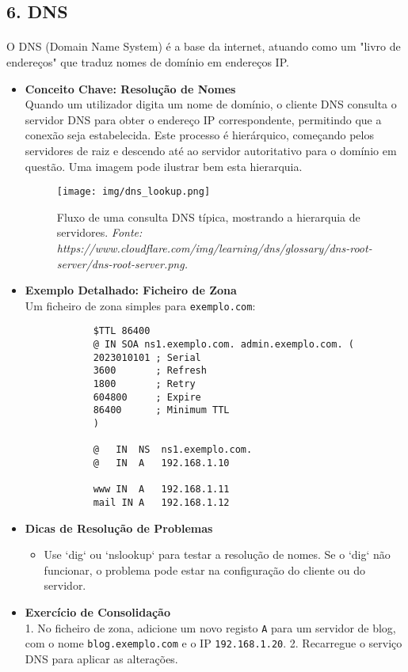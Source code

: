 \documentclass[10pt,a4paper]{article}
\begin{document}
	\subsection*{6. DNS}
	\vspace{-1.2em}
	\paragraph{}
	O DNS (Domain Name System) é a base da internet, atuando como um "livro de endereços" que traduz nomes de domínio em endereços IP.
	
	\begin{itemize}
		\item \textbf{Conceito Chave: Resolução de Nomes} \\
		Quando um utilizador digita um nome de domínio, o cliente DNS consulta o servidor DNS para obter o endereço IP correspondente, permitindo que a conexão seja estabelecida. Este processo é hierárquico, começando pelos servidores de raiz e descendo até ao servidor autoritativo para o domínio em questão. Uma imagem pode ilustrar bem esta hierarquia.
		
		\begin{figure}[h]
			\centering
			\texttt{[image: img/dns\_lookup.png]}
			\caption{Fluxo de uma consulta DNS típica, mostrando a hierarquia de servidores. \textit{Fonte: https://www.cloudflare.com/img/learning/dns/glossary/dns-root-server/dns-root-server.png.}}
			\label{fig:dns_lookup}
		\end{figure}
		
		\item \textbf{Exemplo Detalhado: Ficheiro de Zona} \\
		Um ficheiro de zona simples para \texttt{exemplo.com}:
		\begin{verbatim}
			$TTL 86400
			@ IN SOA ns1.exemplo.com. admin.exemplo.com. (
			2023010101 ; Serial
			3600       ; Refresh
			1800       ; Retry
			604800     ; Expire
			86400      ; Minimum TTL
			)
			
			@   IN  NS  ns1.exemplo.com.
			@   IN  A   192.168.1.10
			
			www IN  A   192.168.1.11
			mail IN A   192.168.1.12
		\end{verbatim}
		
		\item \textbf{Dicas de Resolução de Problemas} \\
		\begin{itemize}
			\item Use `dig` ou `nslookup` para testar a resolução de nomes. Se o `dig` não funcionar, o problema pode estar na configuração do cliente ou do servidor.
		\end{itemize}
		
		\item \textbf{Exercício de Consolidação} \\
		1. No ficheiro de zona, adicione um novo registo \texttt{A} para um servidor de blog, com o nome \texttt{blog.exemplo.com} e o IP \texttt{192.168.1.20}.
		2. Recarregue o serviço DNS para aplicar as alterações.
	\end{itemize}
	
\end{document}
